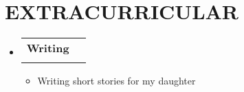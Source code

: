\documentclass[letterpaper,11pt]{article}
\makeatletter
\newcommand{\resumeItem}[1]{
  \item\small{
    {#1 \vspace{-2pt}}
  }
}
\newcommand{\resumeSubheading}[4]{
  \vspace{-2pt}\item
    \begin{tabular*}{1.0\textwidth}[t]{l@{\extracolsep{\fill}}r}
      \textbf{\large#1} & \textbf{\small #2} \\
      \textit{\large#3} & \textit{\small #4} \\
      
    \end{tabular*}\vspace{-7pt}
}
\newcommand{\resumeSubHeadingListStart}{\begin{itemize}[leftmargin=0.0in, label={}]}
\newcommand{\resumeSubHeadingListEnd}{\end{itemize}}
\newcommand{\resumeItemListStart}{\begin{itemize}}
\newcommand{\resumeItemListEnd}{\end{itemize}\vspace{-5pt}}
\makeatother
\begin{document}
\section{EXTRACURRICULAR}
\resumeSubHeadingListStart
\resumeSubheading{Writing }{}{\underline{}}{}
\resumeItemListStart
\resumeItem{\normalsize{Writing short stories for my daughter \textbf{}}}

\resumeItemListEnd
\resumeSubHeadingListEnd
\vspace{0pt}

\end{document}

